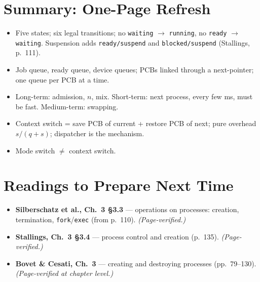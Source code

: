 \documentclass[11pt]{article}
\begin{document}
\section{Summary: One-Page Refresh}

\begin{itemize}
  \item Five states; six legal transitions; no \texttt{waiting} $\to$ \texttt{running}, no \texttt{ready} $\to$ \texttt{waiting}. Suspension adds \texttt{ready/suspend} and \texttt{blocked/suspend} (Stallings, p.~111).
  \item Job queue, ready queue, device queues; PCBs linked through a next-pointer; one queue per PCB at a time.
  \item Long-term: admission, $n$, mix. Short-term: next process, every few ms, must be fast. Medium-term: swapping.
  \item Context switch = save PCB of current + restore PCB of next; pure overhead $s/(q+s)$; dispatcher is the mechanism.
  \item Mode switch $\neq$ context switch.
\end{itemize}

\section{Readings to Prepare Next Time}

\begin{itemize}
  \item \textbf{Silberschatz et al., Ch.~3 \S3.3} --- operations on processes: creation, termination, \texttt{fork}/\texttt{exec} (from p.~110). \emph{(Page-verified.)}
  \item \textbf{Stallings, Ch.~3 \S3.4} --- process control and creation (p.~135). \emph{(Page-verified.)}
  \item \textbf{Bovet \& Cesati, Ch.~3} --- creating and destroying processes (pp.~79--130). \emph{(Page-verified at chapter level.)}
\end{itemize}
\end{document}

